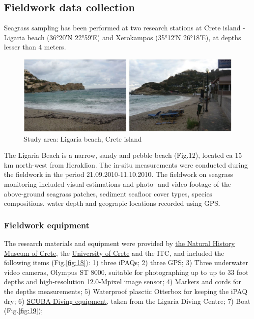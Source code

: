 \documentclass[10pt, a4paper]{article}
\begin{document}
\subsection{Fieldwork data collection}
Seagrass sampling has been performed at two research stations at Crete island - Ligaria beach
(36°20′N 22°59′E) and Xerokampos (35°12′N 26°18′E), at depths lesser than 4 meters. 

\begin{figure}[h]
\centering
\includegraphics[scale=0.25]{Fig-17.jpg}
\caption{Study area: Ligaria beach, Crete island}
\label{fig:17}
\end{figure}

The Ligaria Beach is a narrow, sandy and pebble beach (Fig.12), located ca 15 km north-west from Heraklion.
The in-situ measurements were conducted during the fieldwork in the period 21.09.2010-11.10.2010.
The fieldwork on seagrass monitoring included visual estimations and photo- and video footage of the
above-ground seagrass patches, sediment seafloor cover types, species compositions, water depth and
geograpic locations recorded using GPS.
\pagebreak

\subsubsection{Fieldwork equipment}
The research materials and equipment were provided by \href{http://www.nhmc.uoc.gr/index-2.htm}{the Natural History Museum of Crete}, the \href{http://www.uoc.gr/Department/index.html}{University of Crete} and the ITC, and included the following items (Fig.\ref{fig:18}): 1) three iPAQs; 2)
three GPS; 3) Three underwater video cameras, Olympus ST 8000, suitable for
photographing up to up to 33 foot depths and high-resolution 12.0-Mpixel image sensor; 4)
Markers and cords for the depths measurements; 5) Waterproof plasctic Otterbox for keeping the
iPAQ dry; 6) \href{http://www.padi.com/scuba/}{SCUBA Diving equipment}, taken from the Ligaria Diving Centre; 7) Boat (Fig.\ref{fig:19}); 
\end{document}
